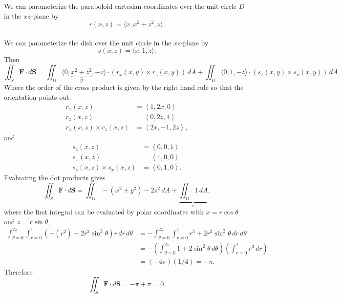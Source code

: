 \documentclass{article}
\newenvironment{solution}[1][Solution.]{\begin{trivlist}
\item[\hskip \labelsep {\bfseries #1}]}{\end{trivlist}}
\begin{document}
\begin{solution} $ $\\
  We can parameterize the paraboloid cartesian coordinates over the unit circle
  $D$ in the $xz$-plane by \[r(x,z) = \langle x,x^2 + z^2, z \rangle.\]
  \\
  We can parameterize the disk over the unit circle in the $xz$-plane by
  \[s(x,z) = \langle x, 1, z \rangle.\]
  Then \[
    \iint_S \mathbf F \cdot d\mathbf S
    = \iint_D
      \langle 0, \underbrace{x^2 + z^2}_{y}, -z \rangle
      \cdot
    (r_x(x,y) \times r_z(x,y))\,
    dA
    +
    \iint_D
      \langle 0, 1, -z \rangle
      \cdot
    (s_z(x,y) \times s_x(x,y))\,
    dA
  \]
  Where the order of the cross product is given by the right hand rule so that
  the orientation points out:  \begin{align*}
    r_x(x,z) &= \left\langle 1, 2x, 0 \right\rangle \\
    r_z(x,z) &= \left\langle 0, 2z, 1 \right\rangle \\
    r_x(x,z) \times r_z(x,z) &= \left\langle
      2x, -1, 2z
    \right\rangle,
    \end{align*}
    and
    \begin{align*}
    s_z(x,z) &= \left\langle 0, 0, 1 \right\rangle \\
    s_x(x,z) &= \left\langle 1, 0, 0 \right\rangle \\
    s_z(x,z) \times s_x(x,z) &= \left\langle
      0, 1, 0
    \right\rangle.
  \end{align*}
  Evaluating the dot products gives \[
    \iint_S \mathbf F \cdot d\mathbf S =
    \iint_D -(x^2 + y^2) - 2z^2\, dA +
    \underbrace{\iint_D 1\, dA}_\pi,
  \]
  where the first integral can be evaluated by polar coordinates with $x = r \cos\theta$ and $z = r\sin\theta$, \begin{align*}
    \int_{\theta=0}^{2\pi}\int_{r=0}^1 (-(r^2) - 2r^2\sin^2\theta) r\,dr\,d\theta
    &= -\int_{\theta=0}^{2\pi}\int_{r=0}^1 r^3 + 2r^3\sin^2\theta\,dr\,d\theta\\
    &= -\left(\int_{\theta=0}^{2\pi} 1 + 2\sin^2\theta\,d\theta\right)
    \left(\int_{r=0}^1 r^3\,dr\right) \\
    &= (-4\pi)(1/4) = -\pi.
  \end{align*}
  Therefore \[
    \iint_S \mathbf F \cdot d\mathbf S = -\pi + \pi = 0.
  \]
\end{solution}
\end{document}
